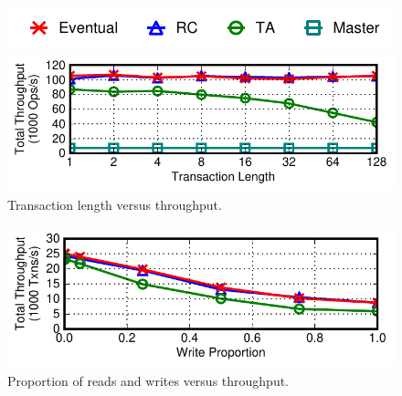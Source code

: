 \begin{figure}[t!]
\begin{center}
\hspace{2em}\includegraphics[width=.8\columnwidth]{figs/strategylegend.pdf}\vspace{-2em}
\end{center}
\begin{center}
\includegraphics[width=\figfactor\columnwidth]{figs/finals/txnlen-thru.pdf}
\end{center}\vspace{-2.25em}
\caption{Transaction length versus throughput.}\vspace{-.5em}
\label{fig:txlen}
\end{figure}
\begin{figure}[t!]
\begin{center}
\includegraphics[width=\figfactor\columnwidth]{figs/finals/wprop-thru.pdf}
\end{center}\vspace{-2.25em}
\caption{Proportion of reads and writes versus throughput.}\vspace{-.5em}
\label{fig:rprop}
\end{figure}
